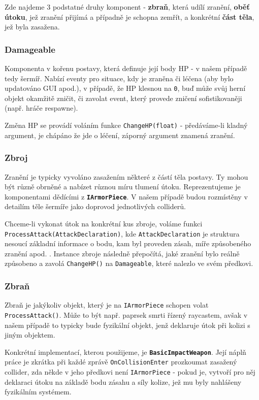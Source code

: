 Zde najdeme 3 podstatné druhy komponent - \textbf{zbraň}, která udílí zranění, \textbf{oběť útoku}, jež zranění přijímá a případně je schopna zemřít, a konkrétní \textbf{část těla}, jež byla zasažena.

\subsubsection*{Damageable}

Komponenta v kořenu postavy, která definuje její body HP - v našem případě tedy šermíř. Nabízí eventy pro situace, kdy je zraněna či léčena (aby bylo updatováno GUI apod.), v případě, že HP klesnou na \texttt{0}, buď může svůj herní objekt okamžitě zničit, či zavolat event, který provede zničení sofistikovaněji (např. hráče respawne). 

Změna HP se provádí voláním funkce \texttt{ChangeHP(float)} - předáváme-li kladný argument, je chápáno že jde o léčení, záporný argument znamená zranění.

\subsubsection*{Zbroj}

Zranění je typicky vyvoláno zasažením některé z částí těla postavy. Ty mohou být různě obrněné a nabízet různou míru tlumení útoku. Reprezentujeme je komponentami dědícími z \textbf{\texttt{IArmorPiece}}. V našem případě budou rozmístěny v detailím těle šermíře jako doprovod jednotlivých colliderů.

Chceme-li vykonat útok na konkrétní kus zbroje, voláme funkci \texttt{ProcessAttack(AttackDeclaration)}, kde \texttt{AttackDeclaration} je struktura nesoucí základní informace o bodu, kam byl proveden zásah, míře způsobeného zranění apod. . Instance zbroje následně přepočítá, jaké zranění bylo reálně způsobeno a zavolá \texttt{ChangeHP()} na \texttt{Damageable}, které nalezlo ve svém předkovi.

\subsubsection*{Zbraň}

Zbraň je jakýkoliv objekt, který je na \texttt{IArmorPiece} schopen volat \texttt{ProcessAttack()}. Může to být např. paprsek smrti řízený raycastem, avšak v našem případě to typicky bude fyzikální objekt, jenž deklaruje útok při kolizi s jiným objektem. 

Konkrétní implementací, kterou použijeme, je \textbf{\texttt{BasicImpactWeapon}}. Její náplň práce je zkrátka při každé zprávě \texttt{OnCollisionEnter} prozkoumat zasažený collider, zda někde v jeho předkovi není \texttt{IArmorPiece} - pokud je, vytvoří pro něj deklaraci útoku na základě bodu zásahu a síly kolize, jež mu byly nahlášeny fyzikálním systémem. 




